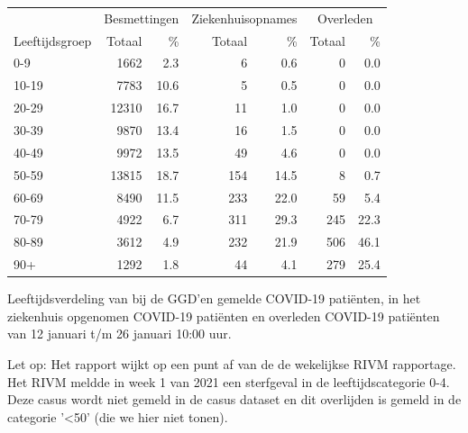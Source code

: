 \documentclass[
  english,
  man,floatsintext]{apa6}
\begin{document}
\begin{table}[H]
\centering\begingroup\fontsize{11}{13}\selectfont

\begin{threeparttable}
\begin{tabular}{lrrrrrr}
\toprule
\multicolumn{1}{c}{ } & \multicolumn{2}{c}{Besmettingen} & \multicolumn{2}{c}{Ziekenhuisopnames} & \multicolumn{2}{c}{Overleden} \\
\cmidrule(l{3pt}r{3pt}){2-3} \cmidrule(l{3pt}r{3pt}){4-5} \cmidrule(l{3pt}r{3pt}){6-7}
Leeftijdsgroep & Totaal & \% & Totaal & \% & Totaal & \%\\
\midrule
0-9 & 1662 & 2.3 & 6 & 0.6 & 0 & 0.0\\
10-19 & 7783 & 10.6 & 5 & 0.5 & 0 & 0.0\\
20-29 & 12310 & 16.7 & 11 & 1.0 & 0 & 0.0\\
30-39 & 9870 & 13.4 & 16 & 1.5 & 0 & 0.0\\
40-49 & 9972 & 13.5 & 49 & 4.6 & 0 & 0.0\\
50-59 & 13815 & 18.7 & 154 & 14.5 & 8 & 0.7\\
60-69 & 8490 & 11.5 & 233 & 22.0 & 59 & 5.4\\
70-79 & 4922 & 6.7 & 311 & 29.3 & 245 & 22.3\\
80-89 & 3612 & 4.9 & 232 & 21.9 & 506 & 46.1\\
90+ & 1292 & 1.8 & 44 & 4.1 & 279 & 25.4\\
\bottomrule
\end{tabular}
\begin{tablenotes}
\item[1] Leeftijdsverdeling van bij de GGD’en gemelde COVID-19 patiënten, in het ziekenhuis opgenomen COVID-19 patiënten en overleden COVID-19 patiënten van 12 januari t/m 26 januari 10:00 uur.
\item[2] Let op: Het rapport wijkt op een punt af van de de wekelijkse RIVM rapportage. Het RIVM meldde in week 1 van 2021 een sterfgeval in de leeftijdscategorie 0-4. Deze casus wordt niet gemeld in de casus dataset en dit overlijden is gemeld in de categorie '<50' (die we hier niet tonen).
\end{tablenotes}
\end{threeparttable}
\endgroup{}
\end{table}

\newpage
\end{document}
